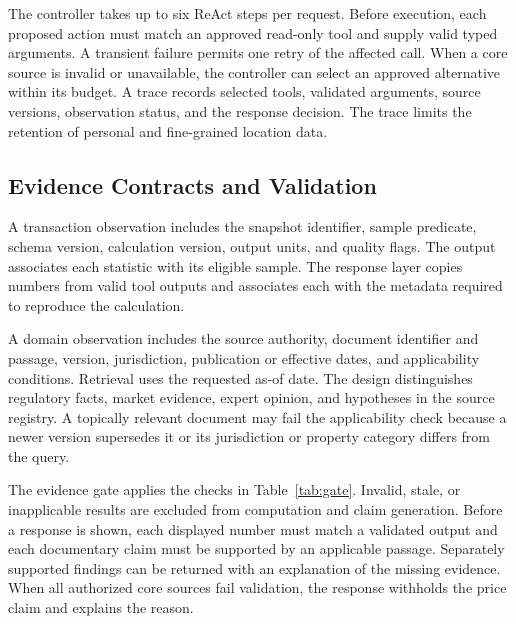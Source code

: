 \documentclass[conference]{IEEEtran}
\begin{document}
The controller takes up to six ReAct steps per request. Before execution, each proposed action must match an approved read-only tool and supply valid typed arguments. A transient failure permits one retry of the affected call. When a core source is invalid or unavailable, the controller can select an approved alternative within its budget. A trace records selected tools, validated arguments, source versions, observation status, and the response decision. The trace limits the retention of personal and fine-grained location data.

\subsection{Evidence Contracts and Validation}
A transaction observation includes the snapshot identifier, sample predicate, schema version, calculation version, output units, and quality flags. The output associates each statistic with its eligible sample. The response layer copies numbers from valid tool outputs and associates each with the metadata required to reproduce the calculation.

A domain observation includes the source authority, document identifier and passage, version, jurisdiction, publication or effective dates, and applicability conditions. Retrieval uses the requested as-of date. The design distinguishes regulatory facts, market evidence, expert opinion, and hypotheses in the source registry. A topically relevant document may fail the applicability check because a newer version supersedes it or its jurisdiction or property category differs from the query.

The evidence gate applies the checks in Table~\ref{tab:gate}. Invalid, stale, or inapplicable results are excluded from computation and claim generation. Before a response is shown, each displayed number must match a validated output and each documentary claim must be supported by an applicable passage. Separately supported findings can be returned with an explanation of the missing evidence. When all authorized core sources fail validation, the response withholds the price claim and explains the reason.
\end{document}
